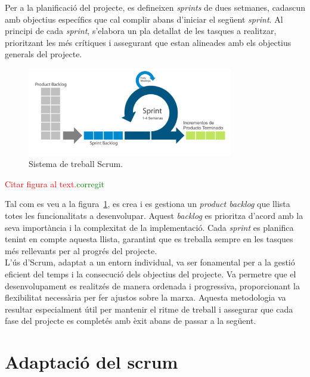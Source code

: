 \documentclass[a4paper,12pt,twoside]{ThesisStyle}
\newcommand{\pau}[1]{\textcolor{red}{#1}}
\newcommand{\sudan}[1]{\textcolor{green}{#1}}
\begin{document}
Per a la planificació del projecte, es defineixen \textit{sprints} de dues setmanes, cadascun amb objectius específics que cal complir abans d'iniciar el següent \textit{sprint}. Al principi de cada \textit{sprint}, s'elabora un pla detallat de les tasques a realitzar, prioritzant les més crítiques i assegurant que estan alineades amb els objectius generals del projecte.\\


\begin{figure}[h!] %
    \centering
    \includegraphics[width=0.8\textwidth]{imatges/scrum.png} %
    \caption{Sistema de treball Scrum.} %
    \label{fig:Sistema de treball Scrum} %
  \end{figure}
  
  \pau{Citar figura al text.}\sudan{corregit}

Tal com es veu a la figura~\ref{fig:Sistema de treball Scrum}, es crea i es gestiona un \textit{product backlog} que llista totes les funcionalitats a desenvolupar. Aquest \textit{backlog} es prioritza d'acord amb la seva importància i la complexitat de la implementació. Cada \textit{sprint} es planifica tenint en compte aquesta llista, garantint que es treballa sempre en les tasques més rellevants per al progrés del projecte.\\

L'ús d'Scrum, adaptat a un entorn individual, va ser fonamental per a la gestió eficient del temps i la consecució dels objectius del projecte. Va permetre que el desenvolupament es realitzés de manera ordenada i progressiva, proporcionant la flexibilitat necessària per fer ajustos sobre la marxa. Aquesta metodologia va resultar especialment útil per mantenir el ritme de treball i assegurar que cada fase del projecte es completés amb èxit abans de passar a la següent.


\section{Adaptació del scrum}
\label{subsec: Adaptació del scrum}
\end{document}
